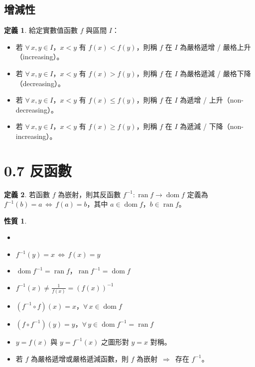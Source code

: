 \documentclass[12pt]{extarticle}
\newcommand{\ds}{\displaystyle}
\newcommand{\ie}{\,\Longrightarrow\,}
\newcommand{\ifff}{\,\Longleftrightarrow\,}
\DeclareMathOperator*{\dom}{dom}
\DeclareMathOperator*{\ran}{ran}
\theoremstyle{definition}
\newtheorem*{dfn}{定義}
\newtheorem*{prp}{性質}
\begin{document}
\subsection*{增減性}

\begin{dfn} 給定實數值函數 $f$ 與區間 $I$：
  \begin{itemize}\setlength\itemsep{0em}
    \item 若 $\forall\,x, y\in I$，$x < y$ 有 $f(x) < f(y)$，則稱 $f$ 在 $I$ 為嚴格遞增 / 嚴格上升（increasing）。
    \item 若 $\forall\,x, y\in I$，$x < y$ 有 $f(x) > f(y)$，則稱 $f$ 在 $I$ 為嚴格遞減 / 嚴格下降（decreasing）。
    \item 若 $\forall\,x, y\in I$，$x < y$ 有 $f(x) \leqslant f(y)$，則稱 $f$ 在 $I$ 為遞增 / 上升（non-decreasing）。
    \item 若 $\forall\,x, y\in I$，$x < y$ 有 $f(x) \geqslant f(y)$，則稱 $f$ 在 $I$ 為遞減 / 下降（non-increasing）。
  \end{itemize}
\end{dfn}

\section*{0.7 反函數}

\begin{dfn}
  若函數 $f$ 為嵌射，則其反函數 $f^{-1}:\ran f\to\dom f$ 定義為 $f^{-1}(b) = a \ifff f(a) = b$，其中 $a\in\dom f$，$b\in\ran f$。
\end{dfn}

\begin{prp}
  \begin{itemize}\setlength\itemsep{0em}
    \item[]
    \item $f^{-1}(y) = x \ifff f(x) = y$
    \item $\dom f^{-1} = \ran f$，$\ran f^{-1} = \dom f$
    \item $\ds f^{-1}(x) \not= \frac{1}{f(x)} = (f(x))^{-1}$
    \item $(f^{-1}\circ f)(x) = x$，$\forall\,x\in\dom f$
    \item $(f\circ f^{-1})(y) = y$，$\forall\,y\in\dom f^{-1} = \ran f$
    \item $y = f(x)$ 與 $y = f^{-1}(x)$ 之圖形對 $y = x$ 對稱。
    \item 若 $f$ 為嚴格遞增或嚴格遞減函數，則 $f$ 為嵌射 $\ie$ 存在 $f^{-1}$。
  \end{itemize}
\end{prp}
\end{document}
